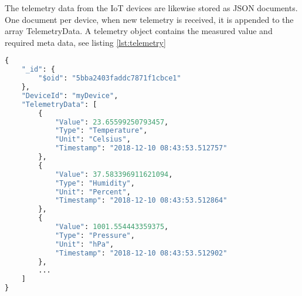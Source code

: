 The telemetry data from the IoT devices are likewise stored as JSON documents. One document per device, when new telemetry is received, it is appended to the array TelemetryData. A telemetry object contains the measured value and required meta data, see listing \ref{lst:telemetry} 

\begin{lstlisting}[language=Python, caption=Telemetry Data, label={lst:telemetry}, basicstyle=\tiny]
{
    "_id": {
        "$oid": "5bba2403faddc7871f1cbce1"
    },
    "DeviceId": "myDevice",
    "TelemetryData": [
        {
            "Value": 23.65599250793457,
            "Type": "Temperature",
            "Unit": "Celsius",
            "Timestamp": "2018-12-10 08:43:53.512757"
        },
        {
            "Value": 37.583396911621094,
            "Type": "Humidity",
            "Unit": "Percent",
            "Timestamp": "2018-12-10 08:43:53.512864"
        },
        {
            "Value": 1001.554443359375,
            "Type": "Pressure",
            "Unit": "hPa",
            "Timestamp": "2018-12-10 08:43:53.512902"
        },
        ...
    ]
}
\end{lstlisting}